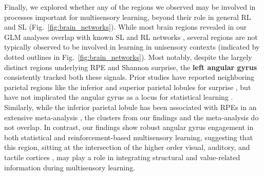 \documentclass{article}
\begin{document}
Finally, we explored whether any of the regions we observed may be involved in processes important for multisensory learning, beyond their role in general RL and SL (Fig.~\ref{fig:brain_networks}). While most brain regions revealed in our GLM analyses overlap with known SL and RL networks \cite{fouragnan2018separate, chase2015reinforcement, garrison2013prediction, konovalov2018neurocomputational, visalli2019bayesian, o2013dissociable, corlett2022meta}, several regions are not typically observed to be involved in learning in unisensory contexts (indicated by dotted outlines in Fig.~\ref{fig:brain_networks}). Most notably, despite the largely distinct regions underlying RPE and Shannon surprise, the \textbf{left angular gyrus} consistently tracked both these signals. Prior studies have reported neighboring parietal regions like the inferior and superior parietal lobules for surprise \cite{visalli2019bayesian, konovalov2018neurocomputational, o2013dissociable}, but have not implicated the angular gyrus as a locus for statistical learning \cite{corlett2022meta, fouragnan2018separate, chase2015reinforcement, garrison2013prediction}. Similarly, while the inferior parietal lobule has been associated with RPEs in an extensive meta-analysis \cite{corlett2022meta}, the clusters from our findings and the meta-analysis do not overlap. In contrast, our findings show robust angular gyrus engagement in both statistical and reinforcement-based multisensory learning, suggesting that this region, sitting at the intersection of the higher order visual, auditory, and tactile cortices \cite{seghier2013angular}, may play a role in integrating structural and value-related information during multisensory learning.\newline
\end{document}

